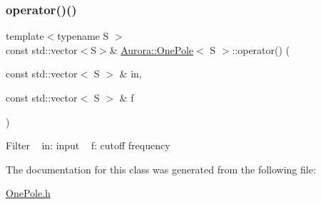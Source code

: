 \subsubsection{\texorpdfstring{operator()()}{operator()()}\hspace{0.1cm}{\footnotesize\ttfamily [2/2]}}
{\footnotesize\ttfamily template$<$typename S $>$ \\
const std\+::vector$<$S$>$\& \hyperlink{class_aurora_1_1_one_pole}{Aurora\+::\+One\+Pole}$<$ S $>$\+::operator() (\begin{DoxyParamCaption}\item[{const std\+::vector$<$ S $>$ \&}]{in,  }\item[{const std\+::vector$<$ S $>$ \&}]{f }\end{DoxyParamCaption})\hspace{0.3cm}{\ttfamily [inline]}}

Filter ~\newline
in\+: input ~\newline
f\+: cutoff frequency ~\newline


The documentation for this class was generated from the following file\+:\begin{DoxyCompactItemize}
\item 
\hyperlink{_one_pole_8h}{One\+Pole.\+h}\end{DoxyCompactItemize}
